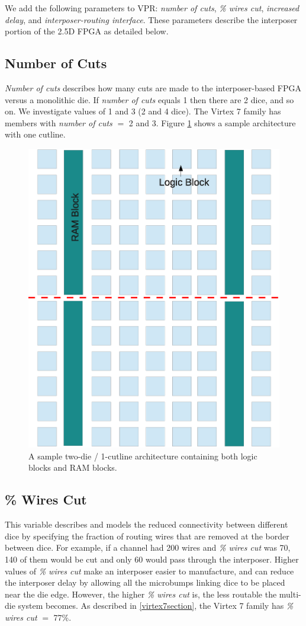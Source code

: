 \documentclass[journal]{IEEEtran}
\begin{document}
We add the following parameters to VPR: \textit{number of cuts}, \textit{\% wires cut}, \textit{increased delay}, and \textit{interposer-routing interface}. These parameters describe the interposer portion of the 2.5D FPGA as detailed below.

\subsection{Number of Cuts}
\textit{Number of cuts} describes how many cuts are made to the interposer-based FPGA versus a monolithic die. If \textit{number of cuts} equals 1 then there are 2 dice, and so on. We investigate values of 1 and 3 (2 and 4 dice). The Virtex 7 family has members with \textit{number of cuts} $=$ 2 and 3. Figure \ref{fig:fpga} shows a sample architecture with one cutline.

\begin{figure}[!htbp]
\centering
\includegraphics[width=0.65\linewidth]{fpga.eps}
\caption{A sample two-die / 1-cutline architecture containing both logic blocks and RAM blocks.}
\label{fig:fpga}
\end{figure}

\subsection{\% Wires Cut}
This variable describes and models the reduced connectivity between different dice by specifying the fraction of routing wires that are removed at the border between dice. For example, if a channel had 200 wires and \textit{\% wires cut} was 70, 140 of them would be cut and only 60 would pass through the interposer. Higher values of \textit{\% wires cut} make an interposer easier to manufacture, and can reduce the interposer delay by allowing all the microbumps linking dice to be placed near the die edge. However, the higher \textit{\% wires cut} is, the less routable the multi-die system becomes. As described in \ref{virtex7section}, the Virtex 7 family has \textit{\% wires cut} $=$ 77\%.
\end{document}

